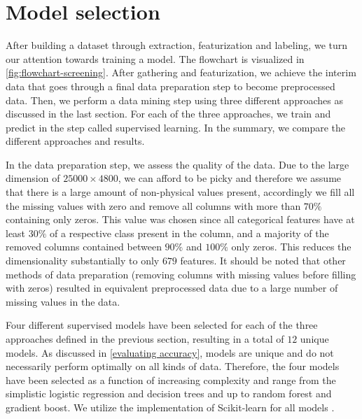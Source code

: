 \begin{comment}
\begin{figure}[t]{1\textwidth}
    \centering
    \texttt{[image: ../predicting-solid-state-qubit-candidates/reports/figures/buildingFeatures/histogram\_oxid\_nelements.pdf]}
    \caption{}
\end{figure}%
\end{comment}

\section{Model selection}

After building a dataset through extraction, featurization and labeling, we turn our attention towards training a model. The flowchart is visualized in \autoref{fig:flowchart-screening}. After gathering and featurization, we achieve the interim data that goes through a final data preparation step to become preprocessed data. Then, we perform a data mining step using three different approaches as discussed in the last section. For each of the three approaches, we train and predict in the step called supervised learning. In the summary, we compare the different approaches and results.

In the data preparation step, we assess the quality of the data. Due to the large dimension of $25000 \times 4800$, we can afford to be picky and therefore we assume that there is a large amount of non-physical values present, accordingly we fill all the missing values with zero and remove all columns with more than $70\%$ containing only zeros. This value was chosen since all categorical features have at least $30\%$ of a respective class present in the column, and a majority of the removed columns contained between $90\%$ and $100\%$ only zeros. This reduces the dimensionality substantially to only $679$ features. It should be noted that other methods of data preparation (removing columns with missing values before filling with zeros) resulted in equivalent preprocessed data due to a large number of missing values in the data.

Four different supervised models have been selected for each of the three approaches defined in the previous section, resulting in a total of $12$ unique models. As discussed in \autoref{evaluating accuracy}, models are unique and do not necessarily perform optimally on all kinds of data. Therefore, the four models have been selected as a function of increasing complexity and range from the simplistic logistic regression and decision trees and up to random forest and gradient boost. We utilize the implementation of Scikit-learn for all models \cite{Pedregosa2012}.

